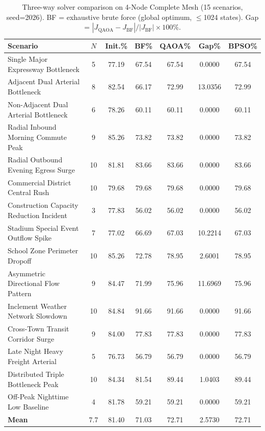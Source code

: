 
\begin{table}[h!]
\centering
\caption{Three-way solver comparison on 4-Node Complete Mesh (15 scenarios, seed=2026). BF = exhaustive brute force (global optimum, $\leq$1024 states). Gap = $|J_{\text{QAOA}}-J_{\text{BF}}|/|J_{\text{BF}}|\times100\%$.}
\label{tab:threeway_4node_complete_mesh}
\begin{tabular}{p{5.0cm} c c c c c c}
\toprule
\textbf{Scenario} & $N$ & \textbf{Init.\%} & \textbf{BF\%} & \textbf{QAOA\%} & \textbf{Gap\%} & \textbf{BPSO\%} \\
\midrule
Single Major Expressway Bottleneck & 5 & 77.19 & 67.54 & 67.54 & 0.0000 & 67.54 \\
Adjacent Dual Arterial Bottleneck & 8 & 82.54 & 66.17 & 72.99 & 13.0356 & 72.99 \\
Non-Adjacent Dual Arterial Bottleneck & 6 & 78.26 & 60.11 & 60.11 & 0.0000 & 60.11 \\
Radial Inbound Morning Commute Peak & 9 & 85.26 & 73.82 & 73.82 & 0.0000 & 73.82 \\
Radial Outbound Evening Egress Surge & 10 & 81.81 & 83.66 & 83.66 & 0.0000 & 83.66 \\
Commercial District Central Rush & 10 & 79.68 & 79.68 & 79.68 & 0.0000 & 79.68 \\
Construction Capacity Reduction Incident & 3 & 77.83 & 56.02 & 56.02 & 0.0000 & 56.02 \\
Stadium Special Event Outflow Spike & 7 & 77.02 & 66.69 & 67.03 & 10.2214 & 67.03 \\
School Zone Perimeter Dropoff & 10 & 85.26 & 72.78 & 78.95 & 2.6001 & 78.95 \\
Asymmetric Directional Flow Pattern & 9 & 84.47 & 71.99 & 75.96 & 11.6969 & 75.96 \\
Inclement Weather Network Slowdown & 10 & 84.84 & 91.66 & 91.66 & 0.0000 & 91.66 \\
Cross-Town Transit Corridor Surge & 9 & 84.00 & 77.83 & 77.83 & 0.0000 & 77.83 \\
Late Night Heavy Freight Arterial & 5 & 76.73 & 56.79 & 56.79 & 0.0000 & 56.79 \\
Distributed Triple Bottleneck Peak & 10 & 84.34 & 81.54 & 89.44 & 1.0403 & 89.44 \\
Off-Peak Nighttime Low Baseline & 4 & 81.78 & 59.21 & 59.21 & 0.0000 & 59.21 \\
\midrule
\textbf{Mean} & 7.7 & 81.40 & 71.03 & 72.71 & 2.5730 & 72.71 \\
\bottomrule
\end{tabular}
\end{table}

